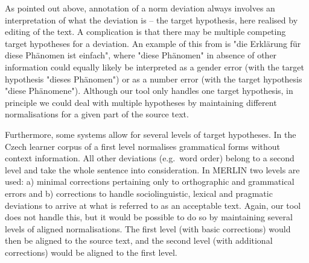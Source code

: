 \documentclass[10pt, a4paper]{article}
\newcommand{\dan}[1]{{\color{Fuchsia}{Dan: #1}}}
\newcommand{\elena}[1]{{\color{BrickRed}{Elena: #1}}}
\newcommand{\mats}[1]{{\color{Blue}{Mats: #1}}}
\newcommand{\normAnn}[0]{our tool }
\begin{document}




As pointed out above, annotation of a norm deviation always involves an interpretation of what the deviation is -- the target hypothesis, here realised by editing of the text. A complication is that there may be multiple competing target hypotheses for a deviation. An example of this from  is "die Erklärung für diese Phänomen ist einfach", where "diese Ph{\"a}nomen" in absence of other information could equally likely be interpreted as a gender error (with the target hypothesis "dieses Ph{\"a}nomen") or as a number error (with the target hypothesis "diese Ph{\"a}nomene"). Although \normAnn only handles one target hypothesis, in principle we could deal with multiple hypotheses by maintaining different normalisations for a given part of the source text.

Furthermore, some systems allow for several levels of target hypotheses. In the Czech learner corpus of  a first level normalises grammatical forms without context information. All other deviations (e.g.\ word order) belong to a second level and take the whole sentence into consideration.
In MERLIN \cite{MERLIN2014} two levels are used: a) minimal corrections pertaining only to orthographic and grammatical errors and b) corrections to handle sociolinguistic, lexical and pragmatic deviations to arrive at what is referred to as an acceptable text. Again, \normAnn does not handle this, but it would be possible to do so by maintaining several levels of aligned normalisations. The first level (with basic corrections) would then be aligned to the source text, and the second level (with additional corrections) would be aligned to the first level.
\end{document}
